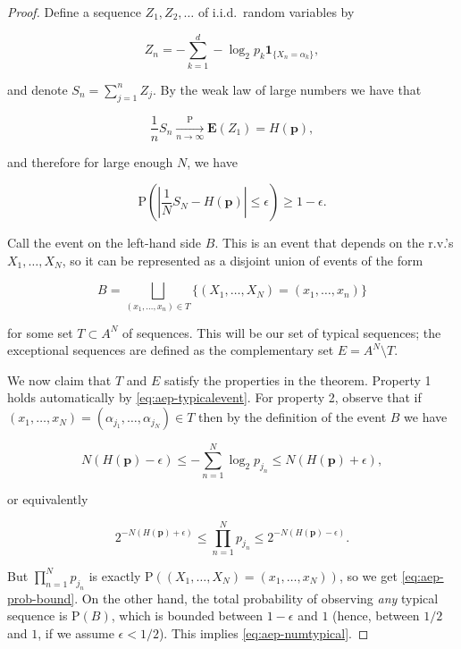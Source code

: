 \documentclass[11pt]{report}
\theoremstyle{plain}
\theoremstyle{definition}
\begin{document}
\begin{proof}
Define a sequence $Z_1, Z_2, \ldots$ of i.i.d.\
random variables by

\[
Z_n = -\sum_{k=1}^d -\log_2 p_k \mathbf{1}_{\{X_n = \alpha_k\}},
\]

\noindent and denote $S_n = \sum_{j=1}^n Z_j$. By the weak law
of large numbers we have that

\[
\frac{1}{n} S_n \xrightarrow[n\to\infty]{\textrm{P}} \mathbf{E}(Z_1) = H(\mathbf{p}),
\]

\noindent and therefore for large enough $N$, we have

\begin{equation*} \tag{28}\label{eq:aep-typicalevent}
\mathrm{P}\left(\left|\frac{1}{N}S_N- H(\mathbf{p})\right|\le \epsilon \right)\ge 1-\epsilon.
\end{equation*}

\noindent Call the event on the left-hand side $B$. This is an
event that depends on the r.v.'s $X_1,\ldots,X_N$, so
it can be represented as a disjoint union of events of
the form

\[
B = \bigsqcup_{(x_1,\ldots,x_n)\in T} \{ (X_1,\ldots,X_N) = (x_1,\ldots,x_n) \}
\]

\noindent for some set $T\subset A^N$ of sequences. This will
be our set of typical sequences; the exceptional
sequences are defined as the complementary set
$E = A^N\setminus T$.

We now claim that $T$ and $E$ satisfy the properties
in the theorem. Property 1 holds automatically by
\eqref{eq:aep-typicalevent}. For property 2, observe that
if
$(x_1,\ldots,x_N)=(\alpha_{j_1},\ldots,\alpha_{j_N})\in
T$
then by the definition of the event $B$ we have

\[
N\left(H(\mathbf{p}) - \epsilon\right) \le
-\sum_{n=1}^N \log_2 p_{j_n} \le N\left(H(\mathbf{p}) + \epsilon\right),
\]

\noindent or equivalently

\[
2^{-N\left(H(\mathbf{p}) + \epsilon\right)} \le
\prod_{n=1}^N p_{j_n} \le
2^{-N\left(H(\mathbf{p}) - \epsilon\right)}.
\]

\noindent But $\prod_{n=1}^N p_{j_n}$ is exactly
$\mathrm{P}((X_1,\ldots,X_N)=(x_1,\ldots,x_N))$, so
we get \eqref{eq:aep-prob-bound}. On the other hand, the
total probability of observing \emph{any} typical sequence
is $\mathrm{P}(B)$, which is bounded between
$1-\epsilon$ and $1$ (hence, between $1/2$ and $1$,
if we assume $\epsilon<1/2$). This implies
\eqref{eq:aep-numtypical}.
\end{proof}
\end{document}
